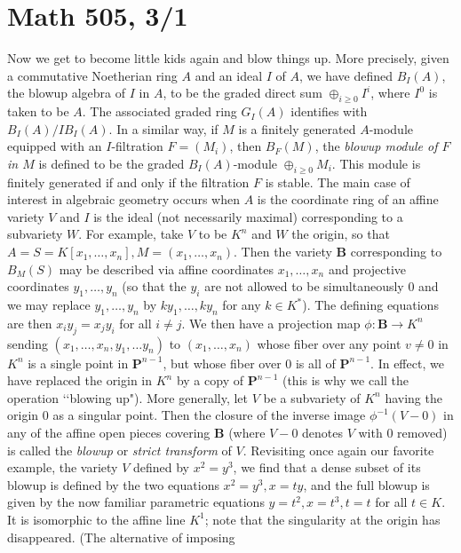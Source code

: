 \documentclass[10pt]{article}
\begin{document}
\section*{Math 505, 3/1}

Now we get to become little kids again and blow things up. More
precisely, given a commutative Noetherian ring $A$ and an ideal $I$ of
$A$, we have defined $B_I(A)$, the blowup algebra of $I$ in $A$, to be
the graded direct sum $\oplus_{i\ge0} I^i$, where $I^0$ is taken to be
$A$. The associated graded ring $G_I(A)$ identifies with
$B_I(A)/IB_I(A)$. In a similar way, if $M$ is a finitely generated
$A$-module equipped with an $I$-filtration $F=(M_i)$, then $B_F(M)$, the
{\sl blowup module of $F$ in $M$} is defined to be the graded
$B_I(A)$-module $\oplus_{i\ge0} M_i$. This module is finitely generated
if and only if the filtration $F$ is stable. The main case of interest
in algebraic geometry occurs when $A$ is the coordinate ring of an
affine variety $V$ and $I$ is the ideal (not necessarily maximal)
corresponding to a subvariety $W$. For example, take $V$ to be $K^n$ and
$W$ the origin, so that $A=S=K[x_1,\ldots,x_n], M= (x_1,\ldots,x_n)$.
Then the variety $\mathbf B$ corresponding to $B_M(S)$ may be described
via affine coordinates $x_1,\ldots,x_n$ and projective coordinates
$y_1,\ldots,y_n$ (so that the $y_i$ are not allowed to be simultaneously
0 and we may replace $y_1,\ldots,y_n$ by $ky_1,\ldots,ky_n$ for any
$k\in K^*$). The defining equations are then $x_i y_j = x_j y_i$ for all
$i\ne j$. We then have a projection map $\phi:\mathbf B\rightarrow K^n$
sending $(x_1,\ldots,x_n,y_1,\ldots y_n)$ to $(x_1,\ldots,x_n)$ whose
fiber over any point $v\ne0$ in $K^n$ is a single point in $\mathbf
P^{n-1}$, but whose fiber over 0 is all of $\mathbf P^{n-1}$. In effect,
we have replaced the origin in $K^n$ by a copy of $\mathbf P^{n-1}$
(this is why we call the operation \lq\lq blowing up"). More generally,
let $V$ be a subvariety of $K^n$ having the origin 0 as a singular
point. Then the closure of the inverse image $\phi^{-1}(V-0)$ in any of
the affine open pieces covering $\mathbf B$ (where $V-0$ denotes $V$
with 0 removed) is called the {\sl blowup} or {\sl strict transform} of
$V$. Revisiting once again our favorite example, the variety $V$ defined
by $x^2 = y^3$, we find that a dense subset of its blowup is defined by
the two equations $x^2 = y^3, x = ty$, and the full blowup is given by
the now familiar parametric equations $y = t^2,x = t^3,t=t$ for all
$t\in K$. It is isomorphic to the affine line $K^1$; note that the
singularity at the origin has disappeared. (The alternative of imposing
\end{document}
